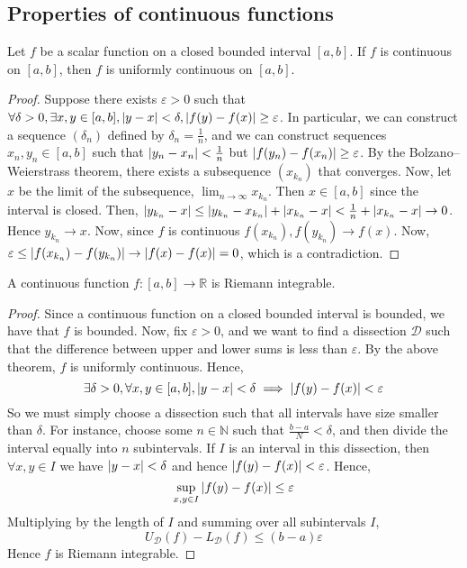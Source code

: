\subsection{Properties of continuous functions}
\begin{theorem}
	Let \( f \) be a scalar function on a closed bounded interval \( [a,b] \).
	If \( f \) is continuous on \( [a,b] \), then \( f \) is uniformly continuous on \( [a,b] \).
\end{theorem}
\begin{proof}
	Suppose there exists \( \varepsilon > 0 \) such that \( \forall \delta > 0, \exists x,y \in [a,b], \abs{y-x} < \delta, \abs{f(y)-f(x)} \geq \varepsilon \).
	In particular, we can construct a sequence \( (\delta_n) \) defined by \( \delta_n = \frac{1}{n} \), and we can construct sequences \( x_n, y_n \in [a,b] \) such that \( \abs{y_n-x_n} < \frac{1}{n} \) but \( \abs{f(y_n) - f(x_n)} \geq \varepsilon \).
	By the Bolzano--Weierstrass theorem, there exists a subsequence \( (x_{k_n}) \) that converges.
	Now, let \( x \) be the limit of the subsequence, \( \lim_{n \to \infty} x_{k_n} \).
	Then \( x \in [a,b] \) since the interval is closed.
	Then, \( \abs{y_{k_n} - x} \leq \abs{y_{k_n} - x_{k_n}} + \abs{x_{k_n} - x} < \frac{1}{n} + \abs{x_{k_n} - x} \to 0 \).
	Hence \( y_{k_n} \to x \).
	Now, since \( f \) is continuous \( f(x_{k_n}), f(y_{k_n}) \to f(x) \).
	Now, \( \varepsilon \leq \abs{f(x_{k_n}) - f(y_{k_n})} \to \abs{f(x) - f(x)} = 0 \), which is a contradiction.
\end{proof}
\begin{corollary}
	A continuous function \( f \colon [a,b] \to \mathbb R \) is Riemann integrable.
\end{corollary}
\begin{proof}
	Since a continuous function on a closed bounded interval is bounded, we have that \( f \) is bounded.
	Now, fix \( \varepsilon > 0 \), and we want to find a dissection \( \mathcal D \) such that the difference between upper and lower sums is less than \( \varepsilon \).
	By the above theorem, \( f \) is uniformly continuous.
	Hence,
	\[
		\exists \delta > 0, \forall x, y \in [a,b], \abs{y-x} < \delta \implies \abs{f(y) - f(x)} < \varepsilon
	\]
	So we must simply choose a dissection such that all intervals have size smaller than \( \delta \).
	For instance, choose some \( n \in \mathbb N \) such that \( \frac{b-a}{N} < \delta \), and then divide the interval equally into \( n \) subintervals.
	If \( I \) is an interval in this dissection, then \( \forall x,y \in I \) we have \( \abs{y-x} < \delta \) and hence \( \abs{f(y) - f(x)} < \varepsilon \).
	Hence,
	\[
		\sup_{x,y \in I} \abs{f(y) - f(x)} \leq \varepsilon
	\]
	Multiplying by the length of \( I \) and summing over all subintervals \( I \),
	\[
		U_{\mathcal D}(f) - L_{\mathcal D}(f) \leq (b-a) \varepsilon
	\]
	Hence \( f \) is Riemann integrable.
\end{proof}
